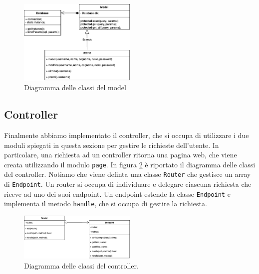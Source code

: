 \begin{figure}[h]
	\centering
	\includegraphics[width=0.5\textwidth]{figures/model}
	\caption{Diagramma delle classi del model}
	\label{fig:model}
\end{figure}

\subsection{Controller}

Finalmente abbiamo implementato il controller, che si occupa di utilizzare i due
moduli spiegati in questa sezione per gestire le richieste dell'utente. In
particolare, una richiesta ad un controller ritorna una pagina web, che viene
creata utilizzando il modulo \texttt{page}. In figura \ref{fig:controller} è
riportato il diagramma delle classi del controller. Notiamo che viene definta
una classe \texttt{Router} che gestisce un array di \texttt{Endpoint}. Un router
si occupa di individuare e delegare ciascuna richiesta che riceve ad uno dei
suoi endpoint. Un endpoint estende la classe \texttt{Endpoint} e implementa il
metodo \texttt{handle}, che si occupa di gestire la richiesta.
\begin{figure}[h]
	\centering
	\includegraphics[width=0.5\textwidth]{figures/controller}
	\caption{Diagramma delle classi del controller.}
	\label{fig:controller}
\end{figure}
